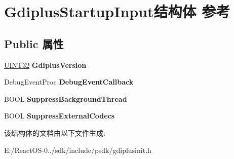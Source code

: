 \hypertarget{struct_gdiplus_startup_input}{}\section{Gdiplus\+Startup\+Input结构体 参考}
\label{struct_gdiplus_startup_input}
\subsection*{Public 属性}
\begin{DoxyCompactItemize}
\item 
\mbox{\label{struct_gdiplus_startup_input_a209043f7acf7db820f7e257e63d5f844}} 
\hyperlink{_processor_bind_8h_ae1e6edbbc26d6fbc71a90190d0266018}{U\+I\+N\+T32} {\bfseries Gdiplus\+Version}
\item 
\mbox{\label{struct_gdiplus_startup_input_af50e96603faa53753a6b138347428b2e}} 
Debug\+Event\+Proc {\bfseries Debug\+Event\+Callback}
\item 
\mbox{\label{struct_gdiplus_startup_input_a82963fd479208a1d96aed9300369abae}} 
B\+O\+OL {\bfseries Suppress\+Background\+Thread}
\item 
\mbox{\label{struct_gdiplus_startup_input_ae624772535b2d64e5d9ec485b72c0dc0}} 
B\+O\+OL {\bfseries Suppress\+External\+Codecs}
\end{DoxyCompactItemize}


该结构体的文档由以下文件生成\+:\begin{DoxyCompactItemize}
\item 
E\+:/\+React\+O\+S-\/0../sdk/include/psdk/gdiplusinit.\+h\end{DoxyCompactItemize}
